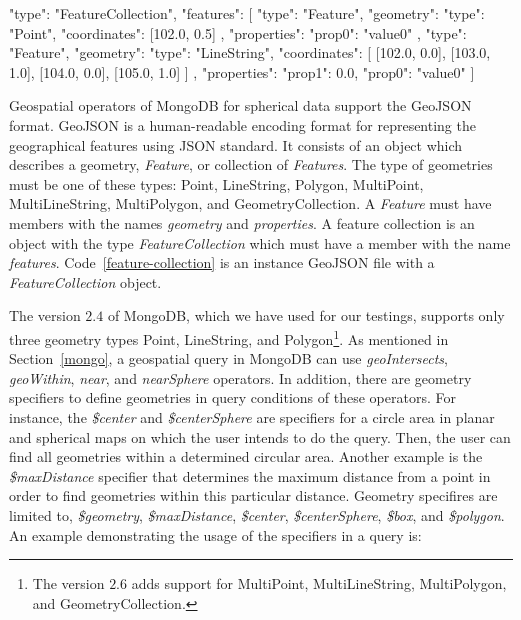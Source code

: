 \documentclass[a4paper,12pt]{article}
\begin{document}
\vspace{10px}
\begin{fakeXML}[label=feature-collection,caption=A GeoJSON file containing a \textit{FeatureCollection} object]
{
  "type": "FeatureCollection",
  "features": [
    {
      "type": "Feature",
      "geometry": {
        "type": "Point",
        "coordinates": [102.0, 0.5]
      },
      "properties": {
        "prop0": "value0"
      }
    },
    {
      "type": "Feature",
      "geometry": {
        "type": "LineString",
        "coordinates": [
          [102.0, 0.0], [103.0, 1.0], [104.0, 0.0], [105.0, 1.0]
        ]
      },
      "properties": {
        "prop1": 0.0,
        "prop0": "value0"
      }
    }
  ]
}
\end{fakeXML}
\vspace{10px}


Geospatial operators of MongoDB for spherical data support the GeoJSON~\cite{www/geojson} format. GeoJSON is a human-readable encoding format for representing the geographical features using JSON standard. It consists of an object which describes a geometry, \textit{Feature}, or collection of \textit{Features}. The type of geometries must be one of these types: Point, Line\-String, Polygon, Multi\-Point, Multi\-Line\-String, MultiPolygon, and Geometry\-Collection. A \textit{Feature} must have members with the names \textit{geometry} and \textit{properties}. A feature collection is an object with the type \textit{Feature\-Collection} which must have a member with the name \textit{features}. Code~\ref{feature-collection} is an instance GeoJSON file with a \textit{Feature\-Collection} object.

The version $2.4$ of MongoDB, which we have used for our testings, supports only three geometry types Point, Line\-String, and Polygon\footnote{The version $2.6$ adds support for Multi\-Point, Multi\-Line\-String, Multi\-Polygon, and Geometry\-Collection.}. As mentioned in Section~\ref{mongo}, a geospatial query in MongoDB can use \textit{geoIntersects}, \textit{geoWithin}, \textit{near}, and \textit{nearSphere} operators. In addition, there are geometry specifiers to define geo\-metries in query conditions of these operators. For instance, the \textit{\$center} and \textit{\$center\-Sphere} are specifiers for a circle area in planar and spherical maps on which the user intends to do the query. Then, the user can find all geometries within a determined circular area. Another example is the \textit{\$maxDistance} specifier that determines the maximum distance from a point in order to find geometries within this particular distance. Geometry specifires are limited to, \textit{\$geometry}, \textit{\$maxDistance}, \textit{\$center}, \textit{\$centerSphere}, \textit{\$box}, and \textit{\$polygon}. An example demonstrating the usage of the specifiers in a query is:
\vspace{10px}
 \vspace{10px}
 
\end{document}
